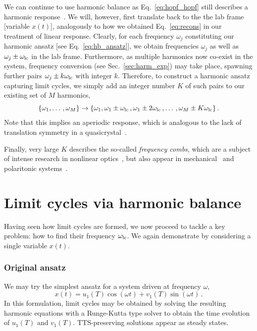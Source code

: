 We can continue to use harmonic balance as Eq.~\eqref{eq:hopf_hopf} still describes a harmonic response~\cite{Allwright_1977}. We will, however, first translate back to the the lab frame [variable $x(t)$], analogously to how we obtained Eq.~\eqref{eq:recons} in our treatment of linear response. Clearly, for each frequency $\omega_j$ constituting our harmonic ansatz [see Eq.~\eqref{eq:hb_ansatz}], we obtain frequencies $\omega_j$ as well as $\omega_j \pm \omega_{\rm lc}$ in the lab frame. 
Furthermore, as multiple harmonics now co-exist in the system, frequency conversion (see Sec.~\ref{sec:harm_exp}) may take place, spawning further pairs $\omega_j \pm k \omega_{\rm lc} $ with integer $k$. Therefore, to construct a harmonic ansatz capturing limit cycles, we simply add an integer number $K$ of such pairs to our existing set of $M$ harmonics,
\begin{equation}
\{ \omega_1, \ldots\,, \omega_M \} \rightarrow \{\omega_1, \omega_1 \pm \omega_{\rm lc} \,, \omega_1 \pm 2 \omega_{\rm lc}\,, \ldots\,, \omega_M \pm K \omega_{\rm lc} \} \,.
\end{equation}
Note that this implies an aperiodic response, which is analogous to the lack of translation symmetry in a quasicrystal~\cite{Pizzi_2019, Giergiel_2019}.

Finally, very large $K$ describes the so-called \textit{frequency combs}, which are a subject of intense research in nonlinear optics~\cite{Weng_2022, Lugiato_2018, Herr_2012}, but also appear in mechanical~\cite{Ochs_2022, Dykman2019, Czaplewski_2019, Ganesan_2018, Ganesan2017} and polaritonic systems~\cite{Zambon_2020}.

\section{Limit cycles via harmonic balance} \label{sec:hopf_hb}

Having seen how limit cycles are formed, we now proceed to tackle a key problem: how to find their frequency $\omega_{\rm lc}$. We again demonstrate by considering a single variable $x(t)$.

\subsubsection{Original ansatz}

We may try the simplest ansatz for a system driven at frequency $\omega$,
\begin{equation} \label{eq:hopf_simple_ansatz}
 x(t) = u_1(T) \cos(\omega t ) + v_1(T) \sin(\omega t) \,.
\end{equation} 
In this formulation, limit cycles may be obtained by solving the resulting harmonic equations with a Runge-Kutta type solver to obtain the time evolution of $u_1(T)$ and $v_1(T)$. TTS-preserving solutions appear as steady states.


